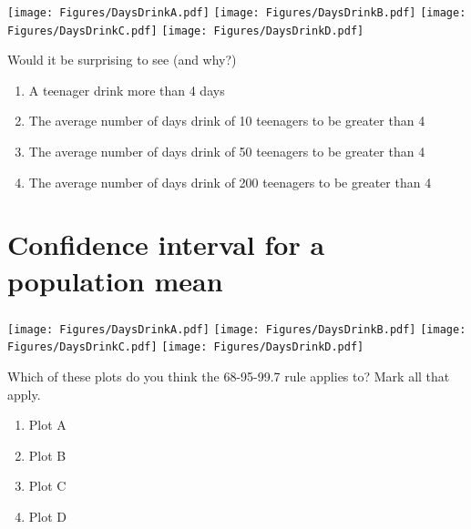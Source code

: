 \begin{frame}
\frametitle{\grp}
\texttt{[image: Figures/DaysDrinkA.pdf]}
\texttt{[image: Figures/DaysDrinkB.pdf]}
\texttt{[image: Figures/DaysDrinkC.pdf]}
\texttt{[image: Figures/DaysDrinkD.pdf]}
\begin{clicker}{Would it be surprising to see (and why?)}
\begin{enumerate}
    \item A teenager drink more than 4 days
    \item The average number of days drink of 10 teenagers to be greater than 4
    \item The average number of days drink of 50 teenagers to be greater than 4
    \item The average number of days drink of 200 teenagers to be greater than 4
\end{enumerate}
\end{clicker}
\end{frame}



\section[CI for mean]{Confidence interval for a population mean}
\begin{frame}
\end{frame}

\begin{frame}
\frametitle{\grp}
\texttt{[image: Figures/DaysDrinkA.pdf]}
\texttt{[image: Figures/DaysDrinkB.pdf]}
\texttt{[image: Figures/DaysDrinkC.pdf]}
\texttt{[image: Figures/DaysDrinkD.pdf]}
\begin{clicker}{Which of these plots do you think the 68-95-99.7 rule applies to?  Mark all that apply.}
\begin{enumerate}
    \item Plot A
    \item Plot B
    \item Plot C
    \item Plot D
\end{enumerate}
\end{clicker}
\end{frame}


